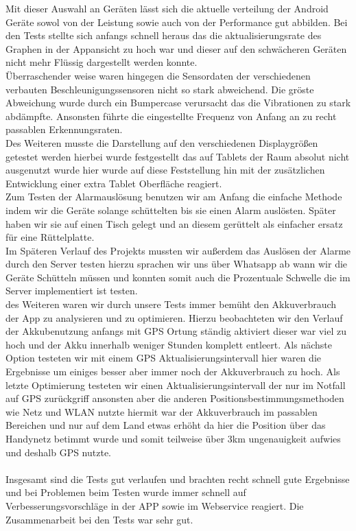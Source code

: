Mit dieser Auswahl an Geräten lässt sich die aktuelle verteilung der Android Geräte sowol von der Leistung sowie auch von der Performance gut abbilden. Bei den Tests stellte sich anfangs schnell heraus das die aktualisierungsrate des Graphen in der Appansicht zu hoch war und dieser auf den schwächeren Geräten nicht mehr Flüssig dargestellt werden konnte.\\
Überraschender  weise waren hingegen die Sensordaten der verschiedenen verbauten Beschleunigungssensoren nicht so stark abweichend. Die gröste Abweichung wurde durch ein Bumpercase verursacht das die Vibrationen zu stark abdämpfte. Ansonsten führte die eingestellte Frequenz von Anfang an zu recht passablen Erkennungsraten.\\
Des Weiteren musste die Darstellung auf den verschiedenen Displaygrößen getestet werden hierbei wurde festgestellt das auf Tablets der Raum absolut nicht ausgenutzt wurde hier wurde auf diese Feststellung hin mit der zusätzlichen Entwicklung einer extra Tablet Oberfläche reagiert.\\
Zum Testen der Alarmauslösung benutzen wir am Anfang die einfache Methode indem wir die Geräte solange schüttelten bis sie einen Alarm auslösten. Später haben wir sie auf einen Tisch gelegt und an diesem gerüttelt als einfacher ersatz für eine Rüttelplatte.\\
Im Späteren Verlauf des Projekts mussten wir außerdem das Auslösen der Alarme durch den Server testen hierzu sprachen wir uns über Whatsapp ab wann wir die Geräte Schütteln müssen und konnten somit auch die Prozentuale Schwelle die im Server implementiert ist testen.\\
des Weiteren waren wir durch unsere Tests immer bemüht den Akkuverbrauch der App zu analysieren und zu optimieren. Hierzu beobachteten wir den Verlauf der Akkubenutzung anfangs mit GPS Ortung ständig aktiviert dieser war viel zu hoch und der Akku innerhalb weniger Stunden komplett entleert. Als nächste Option testeten wir mit einem GPS Aktualisierungsintervall hier waren die Ergebnisse um einiges besser aber immer noch der Akkuverbrauch zu hoch. Als letzte Optimierung testeten wir einen Aktualisierungsintervall der nur im Notfall auf GPS zurückgriff ansonsten aber die anderen Positionsbestimmungsmethoden wie Netz und WLAN nutzte hiermit war der Akkuverbrauch im passablen Bereichen und nur auf dem Land etwas erhöht da hier die Position über das Handynetz betimmt wurde und somit teilweise über 3km ungenauigkeit aufwies und deshalb GPS nutzte.\\
\\
Insgesamt sind die Tests gut verlaufen und brachten recht schnell gute Ergebnisse und bei Problemen beim Testen wurde immer schnell auf Verbesserungsvorschläge in der APP sowie im Webservice reagiert. Die Zusammenarbeit bei den Tests war sehr gut.